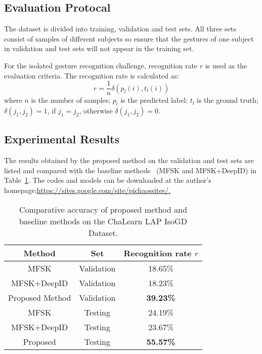 \documentclass[10pt, a4paper, conference]{IEEEtran}
\begin{document}
\subsection{Evaluation Protocal}

The dataset is divided into training, validation and test sets. All three sets consist of samples of different subjects so ensure that the gestures of one subject in validation and test sets will not appear in the training set. 

For the isolated gesture recognition challenge, recognition rate $r$ is used as the evaluation criteria. The recognition rate is calculated as:
\begin{equation}
r = \dfrac{1}{n}\delta(p_{l}(i),t_{l}(i))
\end{equation}
where $n$ is the number of samples; $p_{l}$ is the predicted label; $t_{l}$ is the ground truth; $\delta(j_{1},j_{2}) = 1$, if $j_{1} = j_{2}$, otherwise $\delta(j_{1},j_{2}) = 0$. 
 
 
\subsection{Experimental Results}

The results obtained by the proposed method on the validation and test sets are listed and compared with the baseline methods~\cite{pami16Jun} (MFSK and MFSK+DeepID) in Table~\ref{table2}. The codes and models can be downloaded at the author's homepage:\url{https://sites.google.com/site/pichaossites/}\href{https://sites.google.com/site/pichaossites/}.

\begin{table}[!ht]
\centering
\caption{Comparative accuracy of proposed method and baseline 
methods on the ChaLearn LAP IsoGD Dataset. \label{table2}}
\begin{tabular}{|c|c|c|}
\hline
Method & Set & Recognition rate $r$\\
\hline
MFSK & Validation & 18.65\%\\
\hline
MFSK+DeepID & Validation & 18.23\%\\
\hline
Proposed Method & Validation & \textbf{39.23\%}\\
\hline
MFSK & Testing & 24.19\% \\
\hline
MFSK+DeepID & Testing & 23.67\%\\
\hline
Proposed & Testing &\textbf{55.57\%}\\
\hline
\end{tabular}
\end{table}
\end{document}
